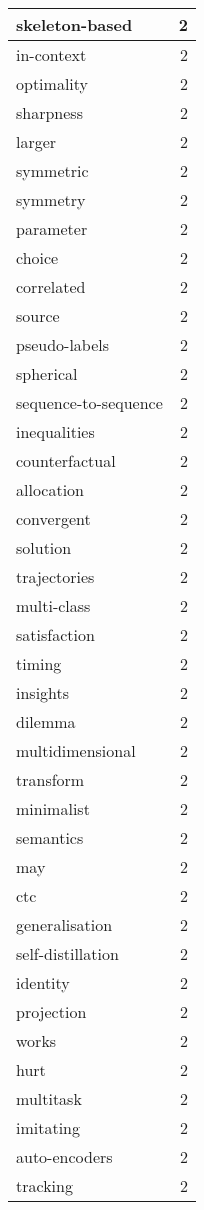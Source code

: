 \begin{table}[h]
\begin{tabular}{|l|r|}
skeleton-based & 2 \\
\hline
in-context & 2 \\
\hline
optimality & 2 \\
\hline
sharpness & 2 \\
\hline
larger & 2 \\
\hline
symmetric & 2 \\
\hline
symmetry & 2 \\
\hline
parameter & 2 \\
\hline
choice & 2 \\
\hline
correlated & 2 \\
\hline
source & 2 \\
\hline
pseudo-labels & 2 \\
\hline
spherical & 2 \\
\hline
sequence-to-sequence & 2 \\
\hline
inequalities & 2 \\
\hline
counterfactual & 2 \\
\hline
allocation & 2 \\
\hline
convergent & 2 \\
\hline
solution & 2 \\
\hline
trajectories & 2 \\
\hline
multi-class & 2 \\
\hline
satisfaction & 2 \\
\hline
timing & 2 \\
\hline
insights & 2 \\
\hline
dilemma & 2 \\
\hline
multidimensional & 2 \\
\hline
transform & 2 \\
\hline
minimalist & 2 \\
\hline
semantics & 2 \\
\hline
may & 2 \\
\hline
ctc & 2 \\
\hline
generalisation & 2 \\
\hline
self-distillation & 2 \\
\hline
identity & 2 \\
\hline
projection & 2 \\
\hline
works & 2 \\
\hline
hurt & 2 \\
\hline
multitask & 2 \\
\hline
imitating & 2 \\
\hline
auto-encoders & 2 \\
\hline
tracking & 2 \\

\end{tabular}
\end{table}
